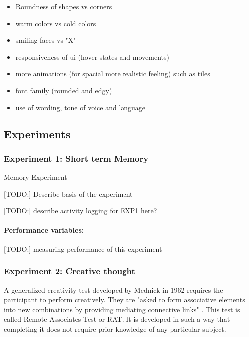 	
	\begin{itemize}
		\item Roundness of shapes vs corners
		\item warm colors vs cold colors
		\item smiling faces vs "X"
		\item responsiveness of ui (hover states and movements)
		\item more animations (for spacial more realistic feeling) such as tiles
		\item font family (rounded and edgy)
		\item use of wording, tone of voice and language \cite{Hancock2007}
	\end{itemize}
	
	\clearpage
	\subsection{Experiments}

		\subsubsection{Experiment 1: Short term Memory} \label{sec:memory}
		
		Memory Experiment 
		
		[TODO:] Describe basis of the experiment
		
		[TODO:] describe activity logging for EXP1 here?
		
		\paragraph{Performance variables:} \label{sec:memory-parameters}
		
		[TODO:] measuring performance of this experiment
		
		\subsubsection{Experiment 2: Creative thought} \label{sec:creativity}
		
		A generalized creativity test developed by Mednick \cite{Mednick1962} in 1962 requires the participant to perform creatively. They are "asked to form associative elements into new combinations by providing mediating connective links" \cite[p. 226]{Mednick1962}. This test is called Remote Associates Test or RAT.
		It is developed in such a way that completing it does not require prior knowledge of any particular subject. 
		

